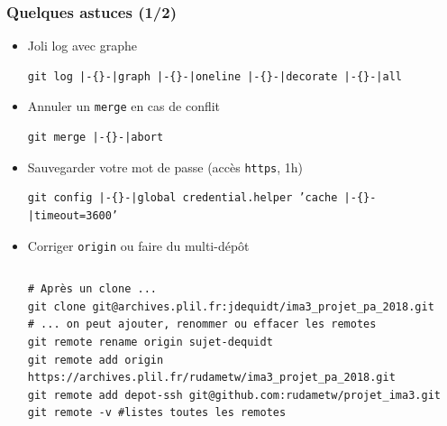 \documentclass[table,tikz,12pt,svgnames]{beamer}
\begin{document}
\begin{frame}[fragile]
\frametitle{Quelques astuces (1/2)}
\vspace{-1em}
\begin{block}{}
\begin{itemize}
\item Joli log avec graphe
\begin{adjustwidth}{0em}{0cm}
\begin{verbatim}
git log |-{}-|graph |-{}-|oneline |-{}-|decorate |-{}-|all
\end{verbatim}
\end{adjustwidth}
\item Annuler un \texttt{merge} en cas de conflit
\begin{adjustwidth}{0em}{0cm}
\begin{verbatim}
git merge |-{}-|abort
\end{verbatim}
\end{adjustwidth}
\item Sauvegarder votre mot de passe (accès \texttt{https}, 1h)
\begin{adjustwidth}{-3em}{0cm}
\begin{verbatim}
git config |-{}-|global credential.helper ’cache |-{}-|timeout=3600’
\end{verbatim}
\end{adjustwidth}
\item Corriger \texttt{origin} ou faire du multi-dépôt
\begin{adjustwidth}{-3.9em}{0cm}
\begin{columns}
\column{\dimexpr\linewidth+24pt}
\begin{verbatim}
# Après un clone ...
git clone git@archives.plil.fr:jdequidt/ima3_projet_pa_2018.git
# ... on peut ajouter, renommer ou effacer les remotes
git remote rename origin sujet-dequidt
git remote add origin https://archives.plil.fr/rudametw/ima3_projet_pa_2018.git
git remote add depot-ssh git@github.com:rudametw/projet_ima3.git
git remote -v #listes toutes les remotes
\end{verbatim}
\end{columns}
\end{adjustwidth}
\end{itemize}
\end{block}
\end{frame}
\end{document}
